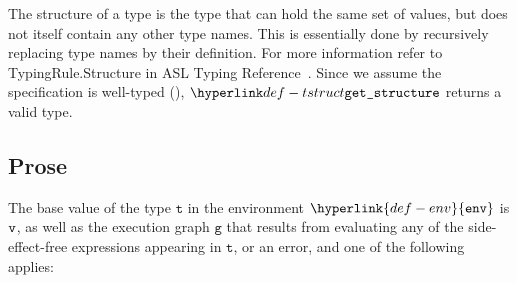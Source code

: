 \documentclass{book}
\newcommand\env[0]{\hyperlink{def-env}{\texttt{env}}}
\newcommand\vg[0]{\texttt{g}}
\newcommand\vt[0]{\texttt{t}}
\begin{document}
The structure of a type is the type that can hold the same set of values, but does not itself
contain any other type names.
This is essentially done by recursively replacing type names by their definition.
For more information refer to TypingRule.Structure in
ASL Typing Reference~\cite{ASLTypingReference}.
%
Since we assume the specification is well-typed (),
$\tstruct$ returns a valid type.

\subsection{Prose}
The base value of the type $\vt$ in the environment $\env$ is $\texttt{v}$,
as well as the execution graph $\vg$ that results
from evaluating any of the side-effect-free expressions appearing in $\vt$,
or an error, and one of the following applies:
\end{document}
